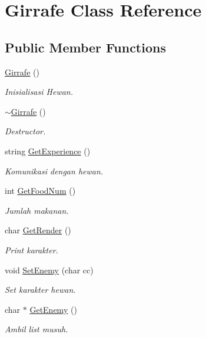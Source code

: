 \hypertarget{class_girrafe}{}\section{Girrafe Class Reference}
\label{class_girrafe}
\subsection*{Public Member Functions}
\begin{DoxyCompactItemize}
\item 
\hyperlink{class_girrafe_a2f0f0d978d40addd7acb4c14f0080087}{Girrafe} ()\hypertarget{class_girrafe_a2f0f0d978d40addd7acb4c14f0080087}{}\label{class_girrafe_a2f0f0d978d40addd7acb4c14f0080087}

\begin{DoxyCompactList}\small\item\em Inisialisasi Hewan. \end{DoxyCompactList}\item 
\hyperlink{class_girrafe_a6ebdc40628ebd34a7debf4cb92d422a5}{$\sim$\+Girrafe} ()\hypertarget{class_girrafe_a6ebdc40628ebd34a7debf4cb92d422a5}{}\label{class_girrafe_a6ebdc40628ebd34a7debf4cb92d422a5}

\begin{DoxyCompactList}\small\item\em Destructor. \end{DoxyCompactList}\item 
string \hyperlink{class_girrafe_a810805c1c3a5c547a49592d827a2e9ba}{Get\+Experience} ()\hypertarget{class_girrafe_a810805c1c3a5c547a49592d827a2e9ba}{}\label{class_girrafe_a810805c1c3a5c547a49592d827a2e9ba}

\begin{DoxyCompactList}\small\item\em Komunikasi dengan hewan. \end{DoxyCompactList}\item 
int \hyperlink{class_girrafe_aae01b0e573a0dd9c6a7998c337faeb25}{Get\+Food\+Num} ()
\begin{DoxyCompactList}\small\item\em Jumlah makanan. \end{DoxyCompactList}\item 
char \hyperlink{class_girrafe_abcc807db3bab7bd47ed164ab66431d39}{Get\+Render} ()
\begin{DoxyCompactList}\small\item\em Print karakter. \end{DoxyCompactList}\item 
void \hyperlink{class_girrafe_a1e5aefb16aca13080273405ecde3a975}{Set\+Enemy} (char cc)
\begin{DoxyCompactList}\small\item\em Set karakter hewan. \end{DoxyCompactList}\item 
char $\ast$ \hyperlink{class_girrafe_a9465d508e528c25c4044fb99948f1ac7}{Get\+Enemy} ()
\begin{DoxyCompactList}\small\item\em Ambil list musuh. \end{DoxyCompactList}\end{DoxyCompactItemize}
